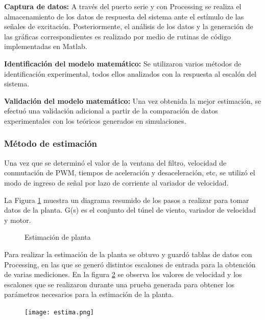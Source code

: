 \textbf{Captura de datos:} A través del puerto serie y con Processing se realiza el almacenamiento de los datos de respuesta del sistema ante el estímulo de las señales de excitación. Posteriormente, el análisis de los datos y la generación de las gráficas correspondientes es realizado por medio de rutinas de código implementadas en Matlab.

 \textbf{Identificación del modelo matemático:} Se utilizaron varios métodos de identificación experimental, todos ellos analizados con la respuesta al escalón del sistema.

 \textbf{Validación del modelo matemático:} Una vez obtenida la mejor estimación, se efectuó una validación adicional a partir de la comparación de datos experimentales con los teóricos generados en simulaciones.






    \subsubsection{Método de estimación}

    Una vez que se determinó el valor de la ventana del filtro, velocidad de conmutación de PWM, tiempos de aceleración y desaceleración, etc, se utilizó el modo de ingreso de señal por lazo de corriente al variador de velocidad. 
    
    La Figura \ref{fig:bloques} muestra un diagrama resumido de los pasos a realizar para tomar datos de la planta. G(s) es el conjunto del túnel de viento, variador de velocidad y motor.


\begin{figure}[htbp]
	\centering
	\centering
	\caption{Estimación de planta} \label{fig:bloques}
\end{figure}
 
    
    Para realizar la estimación de la planta se obtuvo y guardó tablas de datos con Processing, en las que se generó distintos escalones de entrada para la obtención de varias mediciones. En la figura \ref{fig:est2} se observa los valores de velocidad y los escalones que se realizaron durante una prueba generada para obtener los parámetros necesarios para la estimación de la planta.
    
    \begin{figure}[htb]
    	\centering
    	\texttt{[image: estima.png]} %
    	\label{fig:est2}    
    \end{figure}
    
